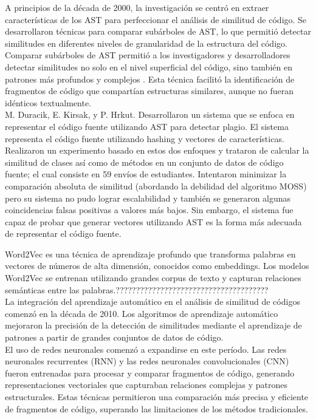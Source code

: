 A principios de la década de 2000, la investigación se centró en extraer características de los AST para perfeccionar el análisis de similitud de código. Se desarrollaron técnicas para comparar subárboles de AST, lo que permitió detectar similitudes en diferentes niveles de granularidad de la estructura del código. \\

Comparar subárboles de AST permitió a los investigadores y desarrolladores detectar similitudes no solo en el nivel superficial del código, sino también en patrones más profundos y complejos \cite{kam2005analyzing}. Esta técnica facilitó la identificación de fragmentos de código que compartían estructuras similares, aunque no fueran idénticos textualmente. \\

M. Duracik, E. Kirsak, y P. Hrkut. \cite{duracik2018source} Desarrollaron un sistema que se enfoca en representar el código fuente utilizando AST para detectar plagio. El sistema representa el código fuente utilizando hashing y vectores de características. Realizaron un experimento basado en estos dos enfoques y trataron de calcular la similitud de clases así como de métodos en un conjunto de datos de código fuente; el cual consiste en 59 envíos de estudiantes. Intentaron minimizar la comparación absoluta de similitud (abordando la debilidad del algoritmo MOSS) pero su sistema no pudo lograr escalabilidad y también se generaron algunas coincidencias falsas positivas a valores más bajos. Sin embargo, el sistema fue capaz de probar que generar vectores utilizando AST es la forma más adecuada de representar el código fuente.

Word2Vec es una técnica de aprendizaje profundo que transforma palabras en vectores de números de alta dimensión, conocidos como embeddings. Los modelos Word2Vec se entrenan utilizando grandes corpus de texto y capturan relaciones semánticas entre las palabras.??????????????????????????????????????  \\


La integración del aprendizaje automático en el análisis de similitud de códigos comenzó en la década de 2010. Los algoritmos de aprendizaje automático mejoraron la precisión de la detección de similitudes mediante el aprendizaje de patrones a partir de grandes conjuntos de datos de código. \\ 

El uso de redes neuronales comenzó a expandirse en este período. Las redes neuronales recurrentes (RNN) y las redes neuronales convolucionales (CNN) fueron entrenadas para procesar y comparar fragmentos de código, generando representaciones vectoriales que capturaban relaciones complejas y patrones estructurales. Estas técnicas permitieron una comparación más precisa y eficiente de fragmentos de código, superando las limitaciones de los métodos tradicionales. \\

